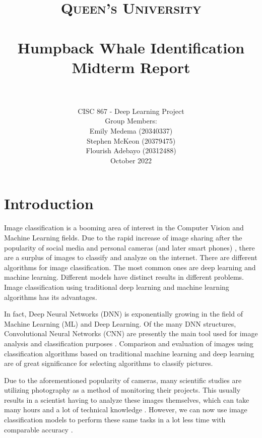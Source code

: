 \documentclass[paper=a4, fontsize=11pt]{scrartcl}
\title{
		\usefont{OT1}{bch}{b}{n}
		\normalfont \normalsize \textsc{Queen's University} \\ [25pt]
		\horrule{0.5pt} \\[0.4cm]
		\huge Humpback Whale Identification Midterm Report \\
		\horrule{2pt} \\[0.5cm]
}
\author{
    \normalfont 
      CISC 867 - Deep Learning Project \\
    \normalfont
    Group Members: \\ 
    \normalsize
    Emily Medema (20340337) \\ 
    \normalsize
    Stephen McKeon (20379475) \\ 
    \normalsize
    Flourish Adebayo (20312488) \\
    October 2022 \\ [3pt]}
\date{\vspace{-5ex}}
\numberwithin{equation}{section}		%
\numberwithin{table}{section}				%
\begin{document}
\maketitle



\newpage 

\section*{Introduction}\label{sec: intro}
Image classification is a booming area of interest in the Computer Vision and Machine Learning fields. Due to the rapid increase of image sharing after the popularity of social media and personal cameras (and later smart phones) \cite{}, there are a surplus of images to classify and analyze on the internet. There are different algorithms for image classification. The most common ones are deep learning and machine learning. Different models have distinct results in different problems. Image classification using traditional deep learning and machine learning algorithms has its advantages. 


In fact, Deep Neural Networks (DNN) is exponentially growing in the field of Machine Learning (ML) and Deep Learning. Of the many DNN structures, Convolutional Neural Networks (CNN) are presently the main tool used for image analysis and classification purposes \cite{}. Comparison and evaluation of images using classification algorithms based on traditional machine learning and deep learning are of great significance for selecting algorithms to classify pictures. 

Due to the aforementioned popularity of cameras, many scientific studies are utilizing photography as a method of monitoring their projects. This usually results in a scientist having to analyze these images themselves, which can take many hours and a lot of technical knowledge \cite{JaisakthiS.M.2017Awms}. However, we can now use image classification models to perform these same tasks in a lot less time with comparable accuracy \cite{JaisakthiS.M.2017Awms}. 
\end{document}
